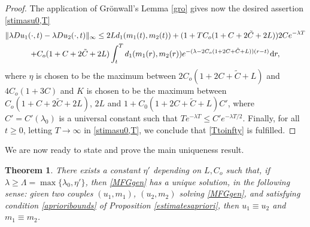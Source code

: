 \documentclass{amsart}
\newtheorem{thm}{Theorem}[section]
\theoremstyle{remark}
\theoremstyle{definition}
\theoremstyle{Claim}
\newcommand{\dd}{\hspace{0.7pt}{\rm d}}
\theoremstyle{plain}
\begin{document}
\begin{proof}
         The application of Gr\"onwall's Lemma \ref{gro} gives now the desired assertion \eqref{stimasu0,T}
	\begin{multline*}
	 \| \lambda D u_1(\cdot,t) - \lambda D u_2(\cdot,t) \|_\infty  \le
	2L  d_1(m_1(t), m_2(t)) + (1+ T {C_o(1+C+2\tilde{C}+2L)}) 2Ce^{-\lambda T}\\
	+{C_o(1+C+2\tilde{C}+2L)} \int_{t}^{T}  d_1(m_1(r), m_2(r)) e^{-(\lambda -{2C_o(1+2C+\tilde{C}+L)}) (r-t)}  \dd r,
	\end{multline*}
	where $\eta$ is chosen to be the maximum between $2C_o(1+2C+\tilde{C}+L)$  and $4C_o(1+3C)$ and $K$ is chosen to be the maximum between $C_o(1+C+2\tilde{C}+2L)$, $2L$ and $1+C_0(1+2C+\tilde{C}+L)C'$, where $C' = C'(\lambda_0)$ is a universal constant such that $T e^{-\lambda T} \le C' e^{-\lambda T/2}$. Finally, for all $t\geq 0$, letting $T\to \infty$ in \eqref{stimasu0,T}, we conclude that \eqref{Ttoinfty} is fulfilled.
	\end{proof}
	
	We are now ready to state and prove the main uniqueness result.
	
	\begin{thm}\label{maingen}
	There exists a constant $\eta'$ depending on $L,C_o$ such that, if $\lambda\ge\Lambda = \max\{\lambda_0, \eta'\}$, then \eqref{MFGgen} has a unique solution, in the following sense: given two couples $(u_1,m_1)$, $(u_2,m_2)$ solving \eqref{MFGgen}, and satisfying condition \eqref{aprioribounds} of Proposition \ref{estimatesapriori}, then $u_1 \equiv u_2$ and $m_1 \equiv m_2$.
\end{thm}
\end{document}
